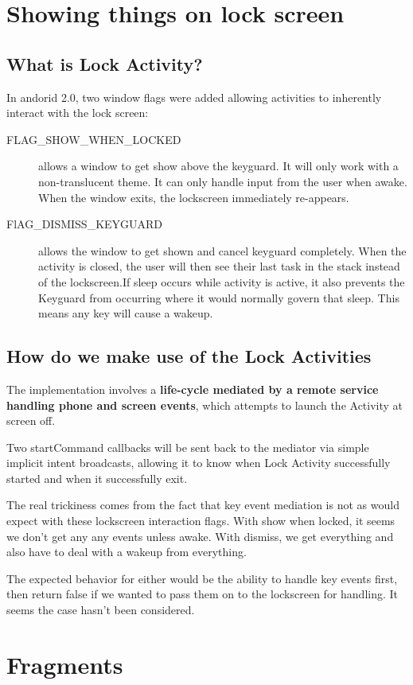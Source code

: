 \documentclass[11pt, a4paper]{book}
\begin{document}
\chapter{Showing things on lock screen}
\section{What is Lock Activity?}
In andorid 2.0, two window flags were added allowing activities to inherently
interact with the lock screen:
\begin{description}
    \item[FLAG\_SHOW\_WHEN\_LOCKED] allows a window to get show above the keyguard. It
    will only work with a non-translucent theme. It can only handle input from the
    user when awake. When the window exits, the lockscreen immediately re-appears.
    \item[FlAG\_DISMISS\_KEYGUARD] allows the window to get shown and cancel keyguard
    completely. When the activity is closed, the user will then see their last task
    in the stack instead of the lockscreen.If sleep occurs while activity is active,
    it also prevents the Keyguard from occurring where it would normally govern that
    sleep. This means any key will cause a wakeup.
\end{description}

\section{How do we make use of the Lock Activities}
The implementation involves a \textbf{life-cycle mediated by a remote service
handling phone and screen events}, which attempts to launch the Activity at
screen off.

Two startCommand callbacks will be sent back to the mediator via simple implicit
intent broadcasts, allowing it to know when Lock Activity successfully started
and when it successfully exit.

The real trickiness comes from the fact that key event mediation is not as would
expect with these lockscreen interaction flags. With show when locked, it seems
we don't get any any events unless awake. With dismiss, we get everything and
also have to deal with a wakeup from everything.

The expected behavior for either would be the ability to handle key events
first, then return false if we wanted to pass them on to the lockscreen for
handling. It seems the case hasn't been considered.
\chapter{Fragments}
\end{document}
